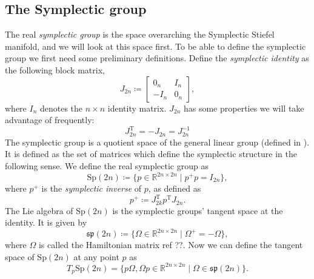 \subsection{The Symplectic group}
The real \textit{symplectic group} is the space overarching the Symplectic Stiefel manifold, and we will look at this space first. To be able to define the symplectic group we first need some preliminary definitions. Define the \textit{symplectic identity} as the following block matrix,
\begin{equation*}
    J_{2n}\coloneqq\begin{bmatrix}
        0_{n} & I_{n} \\
        -I_{n} & 0_{n}
    \end{bmatrix},
\end{equation*}
where $I_{n}$ denotes the $n\times n$ identity matrix. $J_{2n}$ has some properties we will take advantage of frequently:
\begin{equation}\label{eq:J_2n_properties}
    J_{2n} ^{\mathrm{T}}=-J_{2n}=J_{2n}^{-1}
\end{equation}
The symplectic group is a quotient space of the general linear group (defined in ). It is defined as the set of matrices which define the symplectic structure in the following sense. We define the real symplectic group as
\begin{equation}\label{eq:sp_def}
    \mathrm{Sp}(2n)\coloneqq \{p\in \mathbb{R}^{2n\times2n} \;|\; p^{+}p=I_{2n}\},
\end{equation}
where $p^{+}$ is the \textit{symplectic inverse} of $p$, as defined as
\begin{equation}\label{eq:symplectic_inverse}
    p^{+}\coloneqq J_{2k}^{\mathrm{T}}p ^{\mathrm{T}}J_{2n}.
\end{equation}
The Lie algebra of $\mathrm{Sp}(2n)$ is the symplectic groups' tangent space at the identity. It is given by 
\begin{equation}\label{eq:sp_Lie_algebra}
    \mathfrak{sp}(2n)\coloneqq \{\Omega\in \mathbb{R}^{2n\times2n} \;|\; \Omega^{+}=-\Omega\},
\end{equation}
where $\Omega$ is called the Hamiltonian matrix ref ??. 
Now we can define the tangent space of $\mathrm{Sp}(2n)$ at any point $p$  as
\begin{equation}\label{eq:sp_tangent_space}
    T_{p}\mathrm{Sp}(2n)=\{p\Omega,\Omega p\in \mathbb{R}^{2n\times2n} \;|\; \Omega\in\mathfrak{sp}(2n)\}.
\end{equation}

